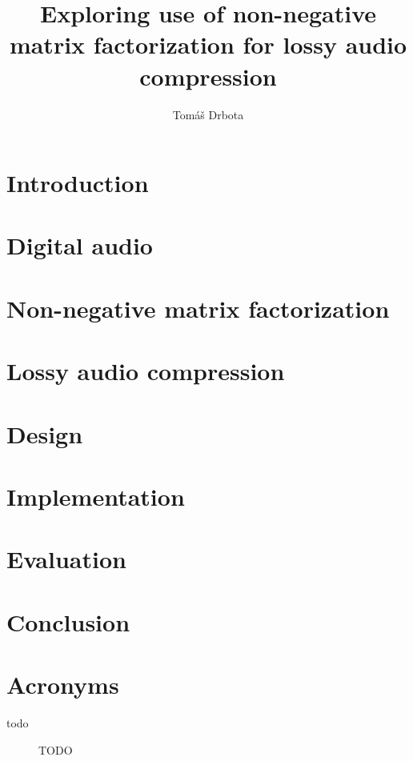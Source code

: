 \documentclass[thesis=M,english,hidelinks]{FITthesis}[2018/03/12]
\title{Exploring use of non-negative matrix factorization for lossy audio compression}
\author{Tomáš Drbota} %
\begin{document}
	

\chapter{Introduction}


\chapter{Digital audio}


\chapter{Non-negative matrix factorization}


\chapter{Lossy audio compression}


\chapter{Design}


\chapter{Implementation}


\chapter{Evaluation}


\chapter{Conclusion}





\appendix

\chapter{Acronyms}
\begin{description}
	\item[todo] TODO
\end{description}
\end{document}
